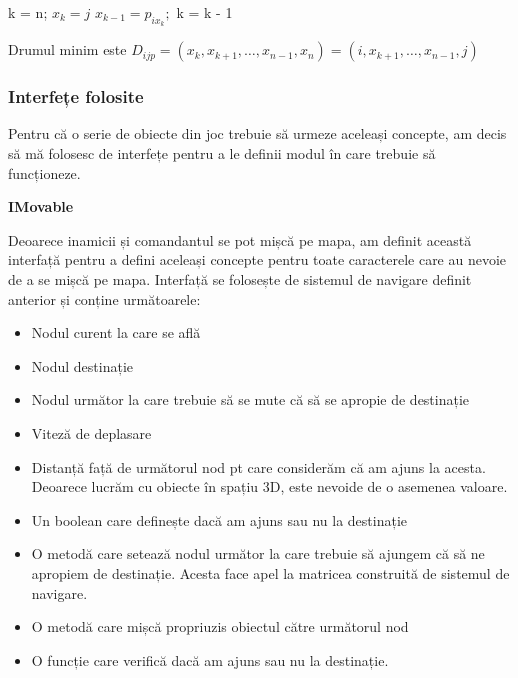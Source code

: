 \documentclass[12pt, a4paper]{article}
\begin{document}
	\begin{algorithmic}
			\State k = n;
			\State $x_k = j$
				\State $x_{k - 1} = p_{ix_k};$
				\State k = k - 1
			\EndWhile
		\EndFunction
	\end{algorithmic}

	Drumul minim este $D_{ijp} = (x_k, x_{k+1}, \dots, x_{n-1}, x_n) = (i, x_{k+1}, \dots, x_{n-1}, j)$
	
	
	
	
	
	\subsubsection{Interfețe folosite}
	
	Pentru că o serie de obiecte din joc trebuie să urmeze aceleași concepte, am decis să mă folosesc de interfețe pentru a le definii modul în care trebuie să funcționeze. 
	\newline
	
	\textbf{IMovable}
	
	Deoarece inamicii și comandantul se pot mișcă pe mapa, am definit această interfață pentru a defini aceleași concepte pentru toate caracterele care au nevoie de a se mișcă pe mapa. Interfață se folosește de sistemul de navigare definit anterior și conține următoarele:
	
	\begin{itemize}
		\item Nodul curent la care se află
		\item Nodul destinație
		\item Nodul următor la care trebuie să se mute că să se apropie de destinație
		\item Viteză de deplasare
		\item Distanță față de următorul nod pt care considerăm că am ajuns la acesta. Deoarece lucrăm cu obiecte în spațiu 3D, este nevoide de o asemenea valoare.
		\item Un boolean care definește dacă am ajuns sau nu la destinație
		\item O metodă care setează nodul următor la care trebuie să ajungem că să ne apropiem de destinație. Acesta face apel la matricea construită de sistemul de navigare.
		\item O metodă care mișcă propriuzis obiectul către următorul nod
		\item O funcție care verifică dacă am ajuns sau nu la destinație.
	\end{itemize}
	\bigskip
	
\end{document}
